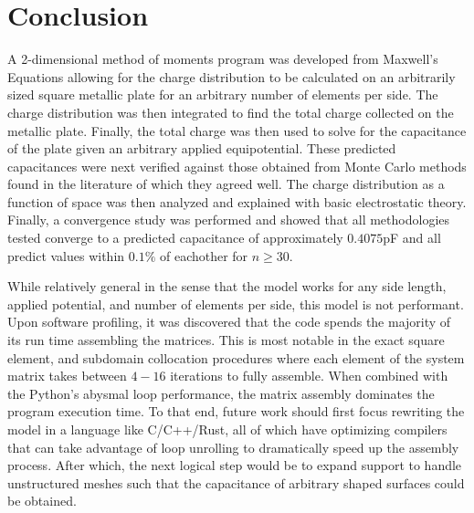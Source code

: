 \section{Conclusion}
\label{sec:conclusion}
A 2-dimensional method of moments program was developed from Maxwell's Equations allowing for the charge distribution to be calculated on an arbitrarily sized square metallic plate for an arbitrary number of elements per side. The charge distribution was then integrated to find the total charge collected on the metallic plate. Finally, the total charge was then used to solve for the capacitance of the plate given an arbitrary applied equipotential. These predicted capacitances were next verified against those obtained from Monte Carlo methods found in the literature of which they agreed well. The charge distribution as a function of space was then analyzed and explained with basic electrostatic theory. Finally, a convergence study was performed and showed that all methodologies tested converge to a predicted capacitance of approximately $0.4075$pF and all predict values within $0.1\%$ of eachother for $n\geq30$.

While relatively general in the sense that the model works for any side length, applied potential, and number of elements per side, this model is not performant. Upon software profiling, it was discovered that the code spends the majority of its run time assembling the matrices. This is most notable in the exact square element, and subdomain collocation procedures where each element of the system matrix takes between $4-16$ iterations to fully assemble. When combined with the Python's abysmal loop performance, the matrix assembly dominates the program execution time. To that end, future work should first focus rewriting the model in a language like C/C++/Rust, all of which have optimizing compilers that can take advantage of loop unrolling to dramatically speed up the assembly process. After which, the next logical step would be to expand support to handle unstructured meshes such that the capacitance of arbitrary shaped surfaces could be obtained.